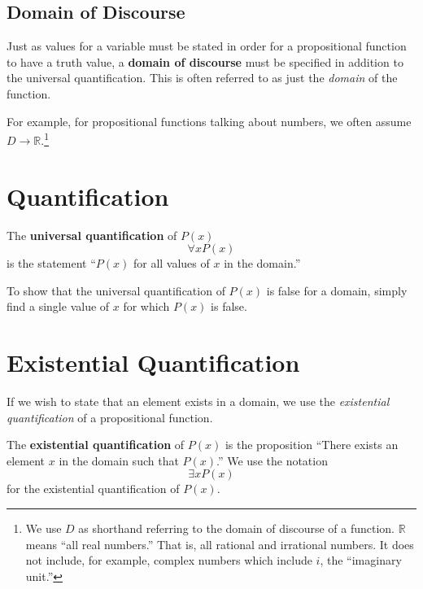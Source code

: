 \subsection{Domain of Discourse}
Just as values for a variable must be stated in order for a propositional function to have a truth value, a \textbf{domain of discourse} must be specified in addition to the universal quantification.
This is often referred to as just the \emph{domain} of the function.


For example, for propositional functions talking about numbers, we often assume $D \to\mathbb{R}$.\footnote{We use $D$ as shorthand referring to the domain of discourse of a function.
$\mathbb{R}$ means ``all real numbers.'' That is, all rational and irrational numbers. It does not include, for example, complex numbers which include $i$, the ``imaginary unit.''}


\section{Quantification}

The \textbf{universal quantification} of $P(x)$
\begin{equation}
  \forall x P(x)
\end{equation}
is the statement
``$P(x)$ for all values of $x$ in the domain.''

To show that the universal quantification of $P(x)$ is false for a domain, simply find a single value of $x$ for which $P(x)$ is false.

\section{Existential Quantification}

If we wish to state that an element exists in a domain, we use the \emph{existential quantification} of a propositional function.

The \textbf{existential quantification} of $P(x)$ is the proposition
  ``There exists an element $x$ in the domain such that $P(x)$.''
We use the notation \[\exists x P(x)\] for the existential quantification of $P(x)$.

